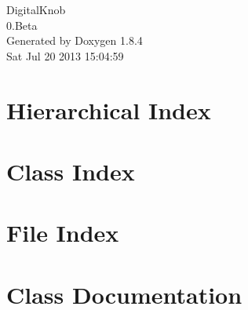 \documentclass[twoside]{book}
\newcommand{\clearemptydoublepage}{%
  \newpage{\pagestyle{empty}\cleardoublepage}%
}
\begin{document}
\hypersetup{pageanchor=false}
\begin{titlepage}
\vspace*{7cm}
\begin{center}%
{\Large Digital\-Knob \\[1ex]\large 0.\-Beta }\\
\vspace*{1cm}
{\large Generated by Doxygen 1.8.4}\\
\vspace*{0.5cm}
{\small Sat Jul 20 2013 15:04:59}\\
\end{center}
\end{titlepage}
\clearemptydoublepage
\tableofcontents
\clearemptydoublepage
{}
\hypersetup{pageanchor=true}

\chapter{Hierarchical Index}

\chapter{Class Index}

\chapter{File Index}

\chapter{Class Documentation}
























































\end{document}
